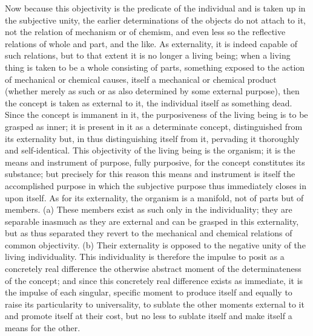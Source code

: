 Now because this objectivity is
the predicate of the individual
and is taken up in the subjective unity,
the earlier determinations of the objects
do not attach to it,
not the relation of mechanism or of chemism,
and even less so the reflective relations
of whole and part, and the like.
As externality, it is indeed capable of such relations,
but to that extent it is no longer a living being;
when a living thing is taken to be a whole consisting of parts,
something exposed to the action of mechanical or chemical causes,
itself a mechanical or chemical product
(whether merely as such or as also
determined by some external purpose),
then the concept is taken as external to it,
the individual itself as something dead.
Since the concept is immanent in it,
the purposiveness of the living being
is to be grasped as inner;
it is present in it as a determinate concept,
distinguished from its externality
but, in thus distinguishing itself from it,
pervading it thoroughly and self-identical.
This objectivity of the living being is the organism;
it is the means and instrument of purpose, fully purposive,
for the concept constitutes its substance;
but precisely for this reason this means and instrument
is itself the accomplished purpose
in which the subjective purpose thus
immediately closes in upon itself.
As for its externality,
the organism is a manifold,
not of parts but of members.
(a) These members exist as such
only in the individuality;
they are separable inasmuch as they are external
and can be grasped in this externality,
but as thus separated they revert to
the mechanical and chemical relations
of common objectivity.
(b) Their externality is opposed to
the negative unity of the living individuality.
This individuality is therefore the impulse
 to posit as a concretely real difference
the otherwise abstract moment of
the determinateness of the concept;
and since this concretely real
difference exists as immediate,
it is the impulse of each singular,
specific moment to produce itself
and equally to raise its particularity to universality,
to sublate the other moments external to it
and promote itself at their cost,
but no less to sublate itself
and make itself a means for the other.


